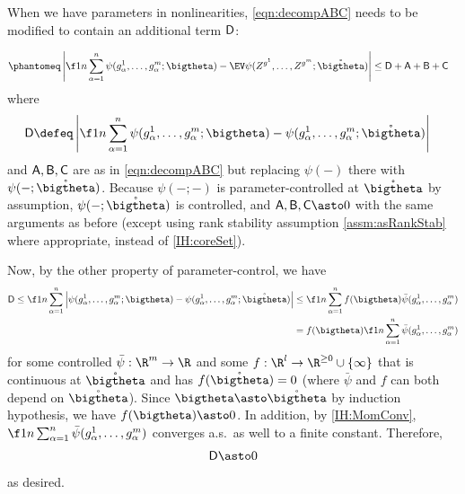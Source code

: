 \documentclass[main.tex]{subfiles}
\begin{document}
When we have parameters in nonlinearities, \cref{eqn:decompABC} needs to be modified to contain an additional term $\mathsf{D}$:

\begin{align*}
    &\phantomeq
        \left|\f 1 n \sum_{\alpha = 1}^n \psi(g^1_\alpha, \ldots, g^{\MM}_\alpha; \bigtheta)
        - \EV \psi(Z^{g^1}, \ldots, Z^{g^\MM}; \mathring{\bigtheta})
        \right|
    \le
        \probD + \probA + \probB + \probC
\end{align*}
where
\begin{align*}
\probD
    &\defeq
        \left|\f 1 n \sum_{\alpha = 1}^n \psi(g^1_\alpha, \ldots, g^{\MM}_\alpha; \bigtheta)
        - \psi(g^1_\alpha, \ldots, g^{\MM}_\alpha; \mathring{\bigtheta})
        \right|
\end{align*}
and $\mathsf{A}, \mathsf{B}, \mathsf{C}$ are as in \cref{eqn:decompABC} but replacing $\psi(-)$ there with $\psi(-; \mathring{\bigtheta})$.
Because $\psi(-; -)$ is parameter-controlled at $\mathring{\bigtheta}$ by assumption, $\psi(-; \mathring{\bigtheta})$ is controlled, and $\probA, \probB, \probC \asto 0$ with the same arguments as before (except using rank stability assumption \cref{assm:asRankStab} where appropriate, instead of \ref{IH:coreSet}).

Now, by the other property of parameter-control, we have
\begin{align*}
\probD
    \le
        \f 1 n \sum_{\alpha = 1}^n 
        \left|\psi(g^1_\alpha, \ldots, g^{\MM}_\alpha; \bigtheta)
        - \psi(g^1_\alpha, \ldots, g^{\MM}_\alpha; \mathring{\bigtheta})
        \right|
    &\le
        \f 1 n \sum_{\alpha = 1}^n 
        f(\bigtheta) \bar \psi(g^1_\alpha, \ldots, g^\MM_\alpha)
        \\
    &=
        f(\bigtheta)
        \f 1 n \sum_{\alpha = 1}^n 
        \bar \psi(g^1_\alpha, \ldots, g^\MM_\alpha)
\end{align*}
for some controlled $\bar \psi: \R^\MM \to \R$ and some $f: \R^l \to \R^{\ge 0} \cup \{\infty\}$ that is continuous at $\mathring{\bigtheta}$ and has $f(\mathring{\bigtheta}) = 0$ (where $\bar \psi$ and $f$ can both depend on $\mathring{\bigtheta}$).
Since $\bigtheta \asto \mathring{\bigtheta}$ by induction hypothesis, we have $f(\bigtheta) \asto 0$.
In addition, by \ref{IH:MomConv}, $\f 1 n \sum_{\alpha = 1}^n 
\bar \psi(g^1_\alpha, \ldots, g^\MM_\alpha)$ converges a.s.\ as well to a finite constant.
Therefore,
\begin{align*}
\probD \asto 0
\end{align*}
as desired.
\end{document}
